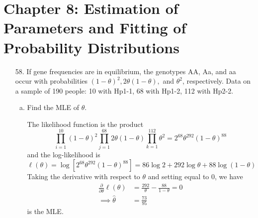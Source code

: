\documentclass{article}
\begin{document}
\newpage
\section*{Chapter 8: Estimation of Parameters and Fitting of Probability Distributions}

\begin{itemize}
	\item[58.] If gene frequencies are in equilibrium, the genotypes AA, Aa, and aa occur with probabilities $(1-\theta)^2, 2\theta(1-\theta),$ and $\theta^2$, respectively. Data on a sample of 190 people: 10 with Hp1-1, 68 with Hp1-2, 112 with Hp2-2.

		\begin{enumerate}[a.]
			\item Find the MLE of $\theta.$
				\begin{soln}
					The likelihood function is the product \[\prod_{i=1}^{10} (1-\theta)^2 \prod_{j=1}^{68} 2\theta(1-\theta)\prod_{k=1}^{112} \theta^2 = 2^{68} \theta^{292}(1-\theta)^{88}\] and the log-likelihood is \[\ell(\theta) = \log\left[ 2^{68}\theta^{292}(1-\theta)^{88} \right]=86\log 2 + 292\log \theta + 88\log(1-\theta)\] Taking the derivative with respect to $\theta$ and setting equal to 0, we have
					\begin{align*}
						\frac{\partial}{\partial\theta}\ell(\theta) &= \frac{292}{\theta}-\frac{88}{1-\theta} = 0 \\
						\implies \hat{\theta} &= \frac{73}{95}
					\end{align*} is the MLE.
					
				\end{soln}


\end{enumerate}
\end{itemize}
\end{document}
